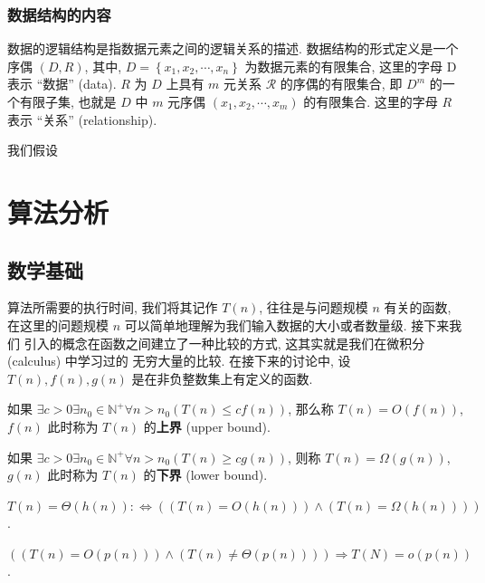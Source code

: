 \documentclass[10pt,UTF8]{book} %
\begin{document}
\subsection{数据结构的内容}

数据的逻辑结构是指数据元素之间的逻辑关系的描述. 
数据结构的形式定义是一个序偶 $(D,R)$, 其中,
$D = \left\{x_1, x_2, \cdots, x_n \right\}$ 为数据元素的有限集合, 这里的字母 D 表示
“数据” (data).
$R$ 为 $D$ 上具有 $m$ 元关系 $\mathcal{R}$ 的序偶的有限集合, 即 $D^m$ 的一个有限子集,
也就是 $D$ 中 $m$ 元序偶 $(x_1, x_2, \cdots, x_m)$ 的有限集合. 
这里的字母 $R$ 表示 “关系” (relationship).

我们假设


\chapter{算法分析}

\section{数学基础}

算法所需要的执行时间, 我们将其记作 $T(n)$, 往往是与问题规模 $n$ 有关的函数,
在这里的问题规模 $n$ 可以简单地理解为我们输入数据的大小或者数量级. 接下来我们
引入的概念在函数之间建立了一种比较的方式, 这其实就是我们在微积分 (calculus) 中学习过的
无穷大量的比较. 在接下来的讨论中, 设 $T(n), f(n), g(n)$ 是在非负整数集上有定义的函数.

\begin{definition}
    如果 $\exists c > 0 \exists n_0 \in \mathbb{N}^+ \forall n>n_0 \left(
        T(n) \leqslant cf(n)
    \right)$, 那么称 $T(n) = O(f(n))$, $f(n)$ 此时称为 $T(n)$ 的\textbf{上界}
    (upper bound).
\end{definition}
\begin{definition}
    如果 $\exists c > 0 \exists n_0 \in \mathbb{N}^+ \forall n>n_0 \left(
        T(n) \geqslant cg(n)
    \right)$, 则称 $T(n) = \varOmega(g(n))$, $g(n)$ 此时称为 $T(n)$
    的\textbf{下界} (lower bound).
\end{definition}
\begin{definition}
    $T(n) = \varTheta(h(n)) :\iff ((T(n)=O(h(n)))\wedge(T(n)=\varOmega(h(n))))$.
\end{definition}
\begin{definition}
    $((T(n) = O(p(n))) \wedge (T(n) \ne \varTheta(p(n)))) \Longrightarrow
    T(N) = o(p(n))$.
\end{definition}
\end{document}
